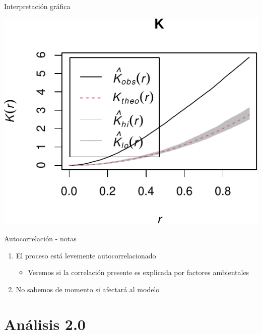 \documentclass[
  11pt,
  ignorenonframetext,
]{beamer}
\providecommand{\tightlist}{%
  \setlength{\itemsep}{0pt}\setlength{\parskip}{0pt}}
\begin{document}
\begin{frame}{Interpretación gráfica}
\protect\hypertarget{interpretaciuxf3n-gruxe1fica}{}
\begin{center}\includegraphics{Tutorial-spatstat-2_files/figure-beamer/unnamed-chunk-10-1} \end{center}
\end{frame}

\begin{frame}{Autocorrelación - notas}
\protect\hypertarget{autocorrelaciuxf3n---notas}{}
\begin{enumerate}
\item
  El proceso está levemente autocorrelacionado

  \begin{itemize}
  \tightlist
  \item
    Veremos si la correlación presente es explicada por factores
    ambientales
  \end{itemize}
\item
  No sabemos de momento si afectará al modelo
\end{enumerate}
\end{frame}

\hypertarget{anuxe1lisis-2.0}{%
\section{Análisis 2.0}\label{anuxe1lisis-2.0}}
\end{document}
